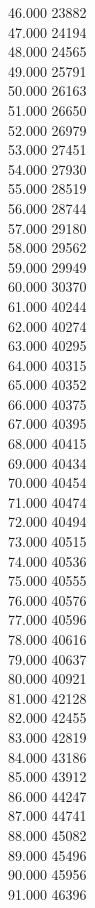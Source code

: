 { 46.000	23882 \\
 47.000	24194 \\
 48.000	24565 \\
 49.000	25791 \\
 50.000	26163 \\
 51.000	26650 \\
 52.000	26979 \\
 53.000	27451 \\
 54.000	27930 \\
 55.000	28519 \\
 56.000	28744 \\
 57.000	29180 \\
 58.000	29562 \\
 59.000	29949 \\
 60.000	30370 \\
 61.000	40244 \\
 62.000	40274 \\
 63.000	40295 \\
 64.000	40315 \\
 65.000	40352 \\
 66.000	40375 \\
 67.000	40395 \\
 68.000	40415 \\
 69.000	40434 \\
 70.000	40454 \\
 71.000	40474 \\
 72.000	40494 \\
 73.000	40515 \\
 74.000	40536 \\
 75.000	40555 \\
 76.000	40576 \\
 77.000	40596 \\
 78.000	40616 \\
 79.000	40637 \\
 80.000	40921 \\
 81.000	42128 \\
 82.000	42455 \\
 83.000	42819 \\
 84.000	43186 \\
 85.000	43912 \\
 86.000	44247 \\
 87.000	44741 \\
 88.000	45082 \\
 89.000	45496 \\
 90.000	45956 \\
 91.000	46396 \\
}
